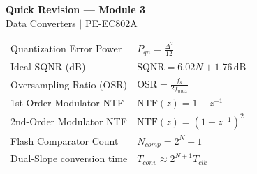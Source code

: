 \documentclass[12pt,a4paper]{article}
\renewcommand{\arraystretch}{1.45}
\begin{document}
\newpage
\begin{center}
  {\large\bfseries\color{myred} Quick Revision --- Module 3}\\[3pt]
  {\small\color{mydark} Data Converters $|$ PE-EC802A}
\end{center}
\noindent{\color{myred}\rule{\linewidth}{1.2pt}}
\vspace{4pt}

\begin{tcolorbox}[formulabox, title={\textbf{Key Formulas at a Glance}}]
\renewcommand{\arraystretch}{1.35}
\begin{tabularx}{\linewidth}{B{5.0cm} X}
Quantization Error Power & $P_{qn} = \frac{\Delta^2}{12}$ \\[4pt]
Ideal SQNR (dB) & $\text{SQNR} = 6.02 N + 1.76\,$dB \\[4pt]
Oversampling Ratio (OSR) & $\text{OSR} = \frac{f_s}{2 f_{max}}$ \\[4pt]
1st-Order Modulator NTF & $\text{NTF}(z) = 1 - z^{-1}$ \\[4pt]
2nd-Order Modulator NTF & $\text{NTF}(z) = (1 - z^{-1})^2$ \\[4pt]
Flash Comparator Count & $N_{comp} = 2^N - 1$ \\[4pt]
Dual-Slope conversion time & $T_{conv} \approx 2^{N+1} T_{clk}$ \\
\end{tabularx}
\end{tcolorbox}
\end{document}
